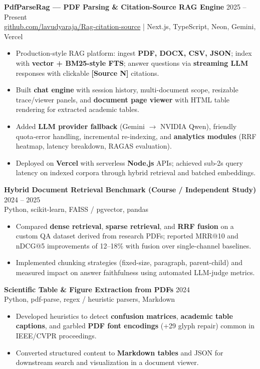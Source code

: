 \documentclass[11pt,letterpaper]{article}
\begin{document}
\textbf{PdfParseRag --- PDF Parsing \& Citation-Source RAG Engine} \hfill 2025 -- Present \\
\href{https://github.com/lavudyaraja/Rag-citation-source}{github.com/lavudyaraja/Rag-citation-source} \;|\; Next.js, TypeScript, Neon, Gemini, Vercel
\begin{itemize}
  \item Production-style RAG platform: ingest \textbf{PDF, DOCX, CSV, JSON}; index with \textbf{vector + BM25-style FTS}; answer questions via \textbf{streaming LLM} responses with clickable \textbf{[Source N]} citations.
  \item Built \textbf{chat engine} with session history, multi-document scope, resizable trace/viewer panels, and \textbf{document page viewer} with HTML table rendering for extracted academic tables.
  \item Added \textbf{LLM provider fallback} (Gemini $\rightarrow$ NVIDIA Qwen), friendly quota-error handling, incremental re-indexing, and \textbf{analytics modules} (RRF heatmap, latency breakdown, RAGAS evaluation).
  \item Deployed on \textbf{Vercel} with serverless \textbf{Node.js} APIs; achieved sub-2s query latency on indexed corpora through hybrid retrieval and batched embeddings.
\end{itemize}

\textbf{Hybrid Document Retrieval Benchmark (Course / Independent Study)} \hfill 2024 -- 2025 \\
Python, scikit-learn, FAISS / pgvector, pandas
\begin{itemize}
  \item Compared \textbf{dense retrieval}, \textbf{sparse retrieval}, and \textbf{RRF fusion} on a custom QA dataset derived from research PDFs; reported MRR@10 and nDCG@5 improvements of 12--18\% with fusion over single-channel baselines.
  \item Implemented chunking strategies (fixed-size, paragraph, parent-child) and measured impact on answer faithfulness using automated LLM-judge metrics.
\end{itemize}

\textbf{Scientific Table \& Figure Extraction from PDFs} \hfill 2024 \\
Python, pdf-parse, regex / heuristic parsers, Markdown
\begin{itemize}
  \item Developed heuristics to detect \textbf{confusion matrices}, \textbf{academic table captions}, and garbled \textbf{PDF font encodings} (+29 glyph repair) common in IEEE/CVPR proceedings.
  \item Converted structured content to \textbf{Markdown tables} and JSON for downstream search and visualization in a document viewer.
\end{itemize}
\end{document}
